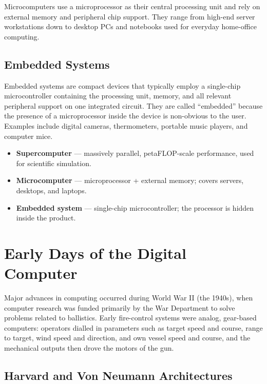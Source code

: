 \documentclass[11pt, a4paper, notitlepage]{report}
\theoremstyle{definition}
\theoremstyle{remark}
\theoremstyle{definition}
\begin{document}
Microcomputers use a microprocessor as their central processing unit and rely on external memory and peripheral chip support. They range from high-end server workstations down to desktop PCs and notebooks used for everyday home-office computing.

\subsection{Embedded Systems}

Embedded systems are compact devices that typically employ a single-chip microcontroller containing the processing unit, memory, and all relevant peripheral support on one integrated circuit. They are called ``embedded'' because the presence of a microprocessor inside the device is non-obvious to the user. Examples include digital cameras, thermometers, portable music players, and computer mice.

\begin{keyresult}[title={Three Classes of Computers}]
\begin{itemize}
  \item \textbf{Supercomputer} --- massively parallel, petaFLOP-scale performance, used for scientific simulation.
  \item \textbf{Microcomputer} --- microprocessor + external memory; covers servers, desktops, and laptops.
  \item \textbf{Embedded system} --- single-chip microcontroller; the processor is hidden inside the product.
\end{itemize}
\end{keyresult}

\section{Early Days of the Digital Computer}

Major advances in computing occurred during World War II (the 1940s), when computer research was funded primarily by the War Department to solve problems related to ballistics. Early fire-control systems were analog, gear-based computers: operators dialled in parameters such as target speed and course, range to target, wind speed and direction, and own vessel speed and course, and the mechanical outputs then drove the motors of the gun.

\subsection{Harvard and Von Neumann Architectures}
\end{document}
